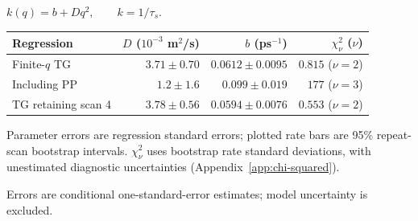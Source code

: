 \par\smallskip\begingroup\small
\setlength{\tabcolsep}{5pt}
\(k(q)=b+Dq^2,\qquad k=1/\tau_s.\)
\par\smallskip\begin{tabular}{lrrr}\toprule
Regression & $D$ ($10^{-3}$ m$^2$/s) & $b$ (ps$^{-1}$) & $\chi^2_\nu$ ($\nu$)\\\midrule
Finite-$q$ TG & $3.71\pm0.70$ & $0.0612\pm0.0095$ & $0.815$ ($\nu=2$)\\
Including PP & $1.2\pm1.6$ & $0.099\pm0.019$ & $177$ ($\nu=3$)\\
TG retaining scan 4 & $3.78\pm0.56$ & $0.0594\pm0.0076$ & $0.553$ ($\nu=2$)\\
\bottomrule\end{tabular}
\par\smallskip\noindent Parameter errors are regression standard errors; plotted rate bars are 95\% repeat-scan bootstrap intervals. $\chi^2_\nu$ uses bootstrap rate standard deviations, with unestimated diagnostic uncertainties (Appendix~\ref{app:chi-squared}).
\par\smallskip\noindent Errors are conditional one-standard-error estimates; model uncertainty is excluded.
\par\endgroup
